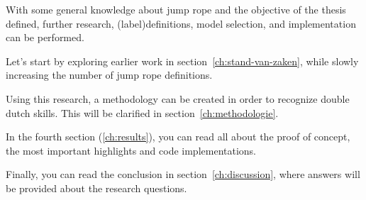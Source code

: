 
With some general knowledge about jump rope and the objective of the thesis defined, further research, (label)definitions, model selection, and implementation can be performed.

Let’s start by exploring earlier work in section~\ref{ch:stand-van-zaken}, while slowly increasing the number of jump rope definitions.

Using this research, a methodology can be created in order to recognize double dutch skills. This will be clarified in section~\ref{ch:methodologie}.

In the fourth section (\ref{ch:results}), you can read all about the proof of concept, the most important highlights and code implementations.

Finally, you can read the conclusion in section~\ref{ch:discussion}, where answers will be provided about the research questions.